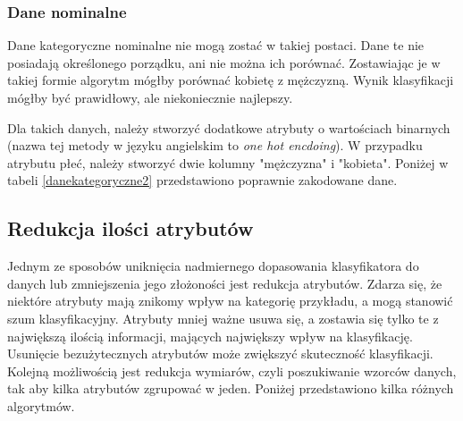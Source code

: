 \subsubsection{Dane nominalne}
Dane kategoryczne nominalne nie mogą zostać w takiej postaci. Dane te nie posiadają określonego porządku, ani nie można ich porównać. Zostawiając je w takiej formie algorytm mógłby porównać kobietę z mężczyzną. Wynik klasyfikacji mógłby być prawidłowy, ale niekoniecznie najlepszy. \par
Dla takich danych, należy stworzyć dodatkowe atrybuty o wartościach binarnych (nazwa tej metody w języku angielskim to \textit{one hot encdoing}). W przypadku atrybutu płeć, należy stworzyć dwie kolumny "mężczyzna" i "kobieta". Poniżej w tabeli \ref{danekategoryczne2} przedstawiono poprawnie zakodowane dane.
\begin{table}[h]
	\begin{center}
			\caption{Przykład z kategorycznymi danymi po odpowiednim kodowaniu.}
			\label{danekategoryczne2}
		\end{center}
	\end{table}
\subsection{Redukcja ilości atrybutów}
Jednym ze sposobów uniknięcia nadmiernego dopasowania klasyfikatora do danych lub zmniejszenia jego złożoności jest redukcja atrybutów. Zdarza się, że niektóre atrybuty mają znikomy wpływ na kategorię przykładu, a mogą stanowić szum klasyfikacyjny. Atrybuty mniej ważne usuwa się, a zostawia się tylko te z największą ilością informacji, mających największy wpływ na klasyfikację. Usunięcie bezużytecznych atrybutów może zwiększyć skuteczność klasyfikacji. Kolejną możliwością jest redukcja wymiarów, czyli poszukiwanie wzorców danych, tak aby kilka atrybutów zgrupować w jeden. Poniżej przedstawiono kilka różnych algorytmów.
